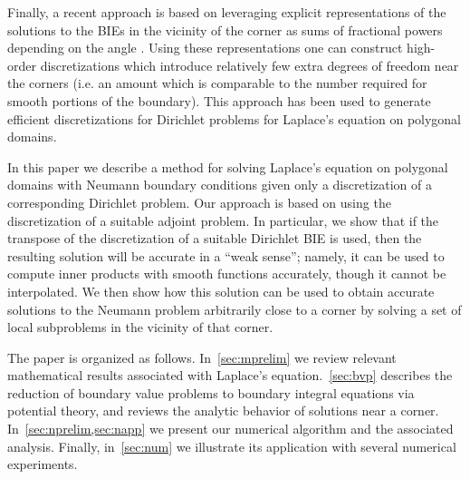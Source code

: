  Finally, a recent approach is based on leveraging explicit representations of the solutions to the BIEs in the vicinity of the corner as sums of fractional powers depending on the angle \cite{serkhacha,serkh2016solution}. Using these representations one can construct high-order discretizations which introduce relatively few extra degrees of freedom near the corners (i.e. an amount which is comparable to the number required for smooth portions of the boundary). This approach has been used to generate efficient discretizations for Dirichlet problems for Laplace's equation on polygonal domains\cite{hoskins2019numerical}. 
 
 In this paper we describe a method for solving Laplace's equation on polygonal domains with Neumann boundary conditions given only a discretization of a corresponding Dirichlet problem. Our approach is based on using the discretization of a suitable adjoint problem. In particular, we show that if the transpose of the discretization of a suitable Dirichlet BIE is used, then the resulting solution will be accurate in a ``weak sense''; namely, it can be used to compute inner products with smooth functions accurately, though it cannot be interpolated. We then show how this solution can be used to obtain accurate solutions to the Neumann problem arbitrarily close to a corner by solving a set of local subproblems in the vicinity of that corner.
 
 The paper is organized as follows. In~\cref{sec:mprelim} we review relevant mathematical results associated with Laplace's equation.~\cref{sec:bvp} describes the reduction of boundary value problems to boundary integral equations via potential theory, and reviews the analytic behavior of solutions near a corner. In~\cref{sec:nprelim,sec:napp} we present our numerical algorithm and the associated analysis. Finally, in~\cref{sec:num} we illustrate its application with several numerical experiments.